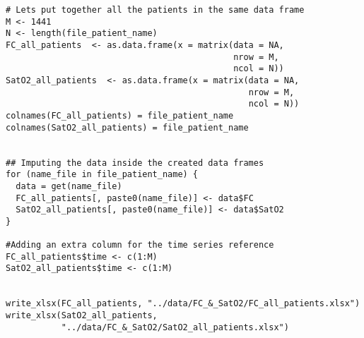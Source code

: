 \begin{lstlisting}[style=mystyle,caption={Creación de Dataframes Individuales de \textit{Frecuencia Cardíaca} y de \textit{Saturación de Oxígeno}}, label={lst:dataframes-idividuales}]
    # Lets put together all the patients in the same data frame
M <- 1441
N <- length(file_patient_name)
FC_all_patients  <- as.data.frame(x = matrix(data = NA,
                                             nrow = M,
                                             ncol = N))
SatO2_all_patients  <- as.data.frame(x = matrix(data = NA,
                                                nrow = M,
                                                ncol = N))
colnames(FC_all_patients) = file_patient_name
colnames(SatO2_all_patients) = file_patient_name


## Imputing the data inside the created data frames
for (name_file in file_patient_name) {
  data = get(name_file)
  FC_all_patients[, paste0(name_file)] <- data$FC
  SatO2_all_patients[, paste0(name_file)] <- data$SatO2
}

#Adding an extra column for the time series reference
FC_all_patients$time <- c(1:M)
SatO2_all_patients$time <- c(1:M)


write_xlsx(FC_all_patients, "../data/FC_&_SatO2/FC_all_patients.xlsx")
write_xlsx(SatO2_all_patients,
           "../data/FC_&_SatO2/SatO2_all_patients.xlsx")
\end{lstlisting}
